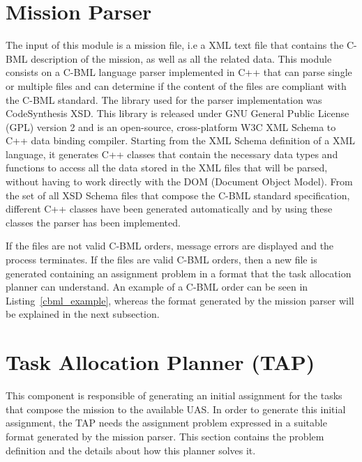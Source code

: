 \documentclass[twocolumn]{svjour3}          %
\begin{document}
\section{Mission Parser}
    \label{sec:mdlp}

The input of this module is a mission file, i.e a XML text file that contains the C-BML description of the mission, as well as all the related data. This module consists on a C-BML language parser implemented in C++ that can parse single or multiple files and can determine if the content of the files are compliant with the C-BML standard. The library used for the parser implementation was CodeSynthesis XSD. This library is released under GNU General Public License (GPL) version 2 and is an open-source, cross-platform W3C XML Schema to C++ data binding compiler. Starting from the XML Schema definition of a XML language, it generates C++ classes that contain the necessary data types and functions to access all the data stored in the XML files that will be parsed, without having to work directly with the DOM (Document Object Model). From the set of all XSD Schema files that compose the C-BML standard specification, different C++ classes have been generated automatically and by using these classes the parser has been implemented. 

If the files are not valid C-BML orders, message errors are displayed and the process terminates. If the files are valid C-BML orders, then a new file is generated containing an assignment problem in a format that the task allocation planner can understand. An example of a C-BML order can be seen in  Listing~\ref{cbml_example}, whereas the format generated by the mission parser will be explained in the next subsection.



\section{Task Allocation Planner (TAP)}
    \label{sec:tap}

This component is responsible of generating an initial assignment for the tasks that compose the mission to the available UAS. In order to generate this initial assignment, the TAP needs the assignment problem expressed in a suitable format generated by the mission parser. This section contains the problem definition and the details about how this planner solves it.
\end{document}
